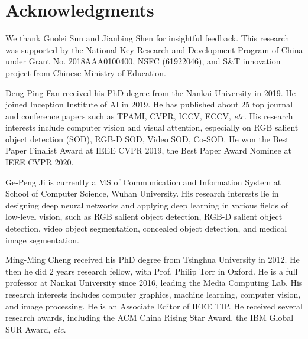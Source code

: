 \documentclass[10pt,journal,compsoc]{IEEEtran}
\def\etc{\emph{etc}}
\begin{document}
\section*{Acknowledgments}
We thank Guolei Sun and Jianbing Shen for insightful feedback.
%
This research was supported by the 
National Key Research and Development Program of China
under Grant No. 2018AAA0100400, NSFC (61922046), 
and S\&T innovation project from Chinese Ministry of Education.



\ifCLASSOPTIONcaptionsoff
  \newpage
\fi



{


}

\vspace{-.5in}
\begin{IEEEbiography}
{Deng-Ping Fan} received his PhD degree from the Nankai University in 2019.
He joined Inception Institute of AI in 2019.
He has published about 25 top journal and conference papers such as TPAMI, CVPR, ICCV, ECCV, \etc. 
His research interests include computer vision and visual attention, especially on 
RGB salient object detection (SOD), RGB-D SOD, Video SOD, Co-SOD. 
He won the Best Paper Finalist Award at IEEE CVPR 2019, 
the Best Paper Award Nominee at IEEE CVPR 2020.
\end{IEEEbiography}
\vspace{-.5in}

\begin{IEEEbiography}
{Ge-Peng Ji} is currently a MS of Communication and Information System at School of Computer Science, Wuhan University. His research interests lie in designing deep neural networks and applying deep learning in various fields of low-level vision, such as RGB salient object detection, RGB-D salient object detection, video object segmentation, concealed object detection, and medical image segmentation.
\end{IEEEbiography}
\vspace{-.5in}

\begin{IEEEbiography}
{Ming-Ming Cheng} received his PhD degree from Tsinghua University in 2012. 
%
He then he did 2 years research fellow, with Prof. Philip Torr in Oxford. 
He is a full professor at Nankai University since 2016,
leading the Media Computing Lab. 
His research interests includes computer graphics, machine learning, 
computer vision, and image processing. 
He is an Associate Editor of IEEE TIP. 
%
He received several research awards, including the ACM China Rising Star Award, 
the IBM Global SUR Award, \etc.
\end{IEEEbiography}
\vspace{-.5in}
\end{document}
